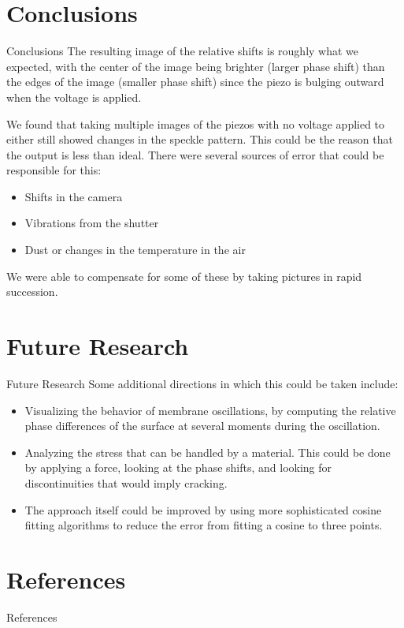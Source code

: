 \documentclass[pdf]{beamer}
\begin{document}
\section{Conclusions}
\begin{frame}{Conclusions}
The resulting image of the relative shifts is roughly what we expected, with the center of the image being brighter (larger phase shift) than the edges of the image (smaller phase shift) since the piezo is bulging outward when the voltage is applied.

\vspace{0.3cm}
We found that taking multiple images of the piezos with no voltage applied to either still showed changes in the speckle pattern. This could be the reason that the output is less than ideal. There were several sources of error that could be responsible for this:
\begin{itemize}
	\item Shifts in the camera
	\item Vibrations from the shutter
	\item Dust or changes in the temperature in the air
\end{itemize}
We were able to compensate for some of these by taking pictures in rapid succession.
\end{frame}

\section{Future Research}
\begin{frame}{Future Research}
Some additional directions in which this could be taken include:
\begin{itemize}
\item{Visualizing the behavior of membrane oscillations, by computing the relative phase differences of the surface at several moments during the oscillation.}
\item{Analyzing the stress that can be handled by a material. This could be done by applying a force, looking at the phase shifts, and looking for discontinuities that would imply cracking.}
\item{The approach itself could be improved by using more sophisticated cosine fitting algorithms to reduce the error from fitting a cosine to three points.}
\end{itemize}
\end{frame}

\section{References}
\begin{frame}{References}

\end{frame}
\end{document}
